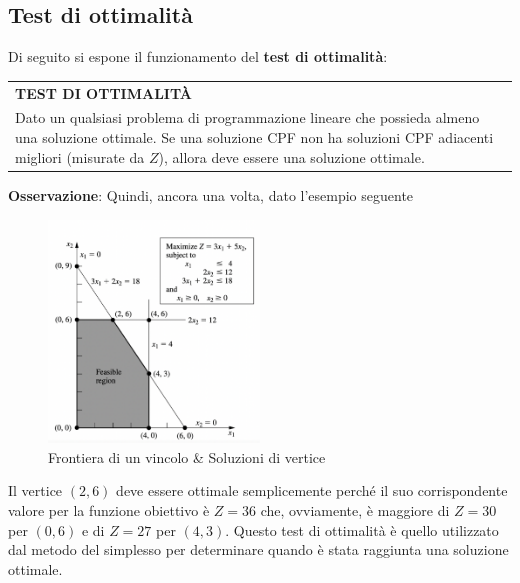 \documentclass[a4paper]{extarticle}
\renewcommand\arraystretch{}
\begin{document}
\vspace{1em}
\subsection{Test di ottimalità}
Di seguito si espone il funzionamento del \textbf{test di ottimalità}:

\vspace{1em}
\setlength{\tabcolsep}{14pt}
\renewcommand{\arraystretch}{2}
\noindent
\begin{tabularx}{\textwidth}{@{}|P|@{}}
    \hline
    {\textbf{TEST DI OTTIMALITÀ}}\\
    \parbox{\linewidth}{Dato un qualsiasi problema di programmazione lineare che possieda almeno una soluzione ottimale. Se una soluzione CPF non ha soluzioni CPF adiacenti migliori (misurate da $Z$), allora deve essere una soluzione ottimale. \vspace{3mm}}\\
    \hline
\end{tabularx}

\newpage
\noindent
\textbf{Osservazione}: Quindi, ancora una volta, dato l'esempio seguente

\begin{figure}[H]
    \centering
    \includegraphics[width=0.5\textwidth]{Frontiera_vincolo_soluzioni_vertice}
    \caption{Frontiera di un vincolo \& Soluzioni di vertice}
    \label{fig:fig1_2}
\end{figure}

\noindent
Il vertice $(2,6)$ deve essere ottimale semplicemente perché il suo corrispondente valore per la funzione obiettivo è $Z=36$ che, ovviamente, è maggiore di $Z=30$ per $(0,6)$ e di $Z=27$ per $(4,3)$. Questo test di ottimalità è quello utilizzato dal metodo del simplesso per determinare quando è stata raggiunta una soluzione ottimale.
\end{document}
